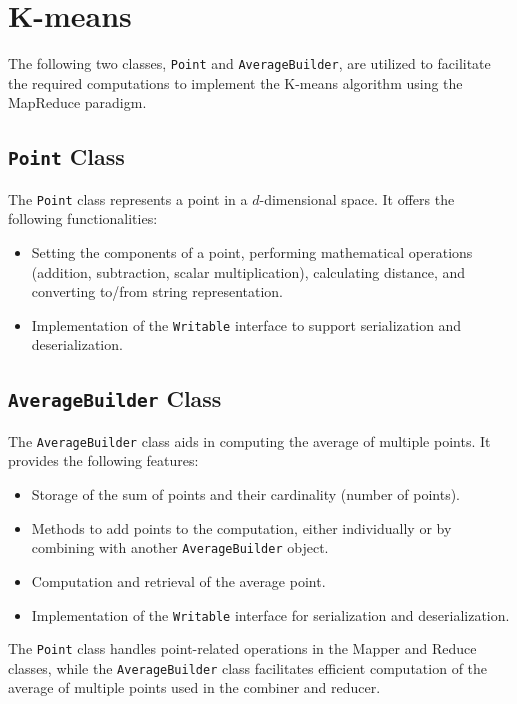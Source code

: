 \documentclass[parskip=full]{report}
\begin{document}
\chapter{K-means}

	The following two classes, \texttt{Point} and \texttt{AverageBuilder}, are utilized to facilitate the required computations to implement the K-means algorithm using the MapReduce paradigm.

	\section{\texttt{Point} Class}

	The \texttt{Point} class represents a point in a $d$-dimensional space. It 
	offers the following functionalities:

	\begin{itemize}
		\item Setting the components of a point, performing mathematical operations (addition, subtraction, scalar multiplication), calculating distance, and converting to/from string representation.
		\item Implementation of the \texttt{Writable} interface to support serialization and deserialization.

	\end{itemize}

	\section{\texttt{AverageBuilder} Class}

	The \texttt{AverageBuilder} class aids in computing the average of multiple points. It provides the following features:

	\begin{itemize}
		\item Storage of the sum of points and their cardinality (number of points).
		\item Methods to add points to the computation, either individually or by combining with another \texttt{AverageBuilder} object.
		\item Computation and retrieval of the average point.
		\item Implementation of the \texttt{Writable} interface for serialization and deserialization.
	\end{itemize}

	The \texttt{Point} class handles point-related operations in the Mapper and Reduce classes, while the \texttt{AverageBuilder} class facilitates efficient computation of the average of multiple points used in the combiner and reducer.
\end{document}
